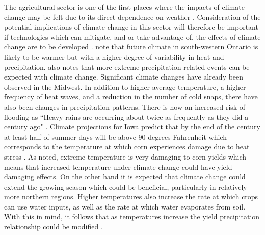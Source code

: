 The agricultural sector is one of the first places where the impacts of climate change may be felt due to its direct dependence on weather \citep{schlenker2009nonlinear}.  Consideration of the potential implications of climate change in this sector will therefore be important if technologies which can mitigate, and or take advantage of, the effects of climate change are to be developed \citep{hansen1991farmer}. \cite{cabas2010crop} note that future climate in south-western Ontario is likely to be warmer but with a higher degree of variability in heat and precipitation. \cite{li2014climate} also notes that  more extreme precipitation related events can be expected with climate change. Significant climate changes have already been observed in the Midwest. In addition to higher average temperature, a higher frequency of heat waves, and a reduction in the number of cold snaps, there have also been changes in precipitation patterns. There is now an increased risk of flooding as “Heavy rains are occurring about twice as frequently as they did a century ago" \citep{Freese2009}. Climate projections for Iowa predict that by the end of the century at least half of summer days will be above 90 degrees Fahrenheit which corresponds to the temperature at which corn experiences damage due to heat stress \citep{schlenker2009nonlinear}. As noted, extreme temperature is very damaging to corn yields which means that increased temperature under climate change could have yield damaging effects. On the other hand it is expected that climate change could extend the growing season which could be beneficial, particularly in relatively more northern regions.  Higher temperatures also increase the rate at which crops can use water inputs, as well as the rate at which water evaporates from soil. With this in mind, it follows that as temperatures increase the yield precipitation relationship could be modified \citep{IowaSWCS}. 


